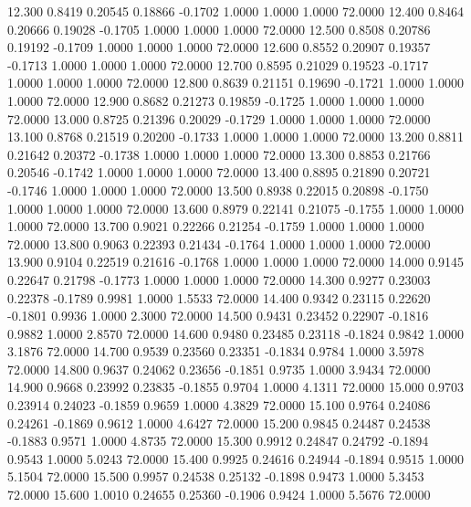   12.300   0.8419   0.20545   0.18866  -0.1702   1.0000   1.0000   1.0000  72.0000
  12.400   0.8464   0.20666   0.19028  -0.1705   1.0000   1.0000   1.0000  72.0000
  12.500   0.8508   0.20786   0.19192  -0.1709   1.0000   1.0000   1.0000  72.0000
  12.600   0.8552   0.20907   0.19357  -0.1713   1.0000   1.0000   1.0000  72.0000
  12.700   0.8595   0.21029   0.19523  -0.1717   1.0000   1.0000   1.0000  72.0000
  12.800   0.8639   0.21151   0.19690  -0.1721   1.0000   1.0000   1.0000  72.0000
  12.900   0.8682   0.21273   0.19859  -0.1725   1.0000   1.0000   1.0000  72.0000
  13.000   0.8725   0.21396   0.20029  -0.1729   1.0000   1.0000   1.0000  72.0000
  13.100   0.8768   0.21519   0.20200  -0.1733   1.0000   1.0000   1.0000  72.0000
  13.200   0.8811   0.21642   0.20372  -0.1738   1.0000   1.0000   1.0000  72.0000
  13.300   0.8853   0.21766   0.20546  -0.1742   1.0000   1.0000   1.0000  72.0000
  13.400   0.8895   0.21890   0.20721  -0.1746   1.0000   1.0000   1.0000  72.0000
  13.500   0.8938   0.22015   0.20898  -0.1750   1.0000   1.0000   1.0000  72.0000
  13.600   0.8979   0.22141   0.21075  -0.1755   1.0000   1.0000   1.0000  72.0000
  13.700   0.9021   0.22266   0.21254  -0.1759   1.0000   1.0000   1.0000  72.0000
  13.800   0.9063   0.22393   0.21434  -0.1764   1.0000   1.0000   1.0000  72.0000
  13.900   0.9104   0.22519   0.21616  -0.1768   1.0000   1.0000   1.0000  72.0000
  14.000   0.9145   0.22647   0.21798  -0.1773   1.0000   1.0000   1.0000  72.0000
  14.300   0.9277   0.23003   0.22378  -0.1789   0.9981   1.0000   1.5533  72.0000
  14.400   0.9342   0.23115   0.22620  -0.1801   0.9936   1.0000   2.3000  72.0000
  14.500   0.9431   0.23452   0.22907  -0.1816   0.9882   1.0000   2.8570  72.0000
  14.600   0.9480   0.23485   0.23118  -0.1824   0.9842   1.0000   3.1876  72.0000
  14.700   0.9539   0.23560   0.23351  -0.1834   0.9784   1.0000   3.5978  72.0000
  14.800   0.9637   0.24062   0.23656  -0.1851   0.9735   1.0000   3.9434  72.0000
  14.900   0.9668   0.23992   0.23835  -0.1855   0.9704   1.0000   4.1311  72.0000
  15.000   0.9703   0.23914   0.24023  -0.1859   0.9659   1.0000   4.3829  72.0000
  15.100   0.9764   0.24086   0.24261  -0.1869   0.9612   1.0000   4.6427  72.0000
  15.200   0.9845   0.24487   0.24538  -0.1883   0.9571   1.0000   4.8735  72.0000
  15.300   0.9912   0.24847   0.24792  -0.1894   0.9543   1.0000   5.0243  72.0000
  15.400   0.9925   0.24616   0.24944  -0.1894   0.9515   1.0000   5.1504  72.0000
  15.500   0.9957   0.24538   0.25132  -0.1898   0.9473   1.0000   5.3453  72.0000
  15.600   1.0010   0.24655   0.25360  -0.1906   0.9424   1.0000   5.5676  72.0000
